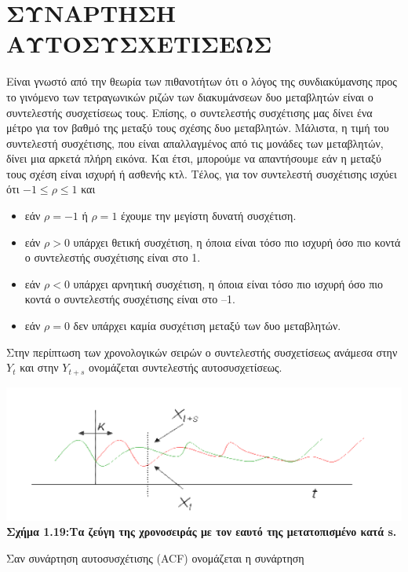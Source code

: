 \section{ΣΥΝΑΡΤΗΣΗ ΑΥΤΟΣΥΣΧΕΤΙΣΕΩΣ}

Είναι γνωστό από την θεωρία των πιθανοτήτων ότι ο λόγος της
συνδιακύμανσης προς το γινόμενο των τετραγωνικών ριζών των διακυμάνσεων δυο
μεταβλητών είναι ο συντελεστής συσχετίσεως τους. Επίσης, ο συντελεστής
συσχέτισης μας δίνει ένα μέτρο για τον βαθμό της μεταξύ τους σχέσης δυο
μεταβλητών. Μάλιστα, η τιμή του συντελεστή συσχέτισης, που είναι απαλλαγμένος
από τις μονάδες των μεταβλητών, δίνει μια αρκετά πλήρη εικόνα. Και έτσι, μπορούμε
να απαντήσουμε εάν η μεταξύ τους σχέση είναι ισχυρή ή ασθενής κτλ. Τέλος, για τον
συντελεστή συσχέτισης ισχύει ότι $-1\leq \rho\leq 1$ και\\
\begin{itemize}
\item εάν $ \rho=-1$ ή $ \rho=1$ έχουμε την μεγίστη δυνατή συσχέτιση.
\item εάν $\rho> 0$ υπάρχει θετική συσχέτιση, η όποια είναι τόσο πιο ισχυρή όσο πιο κοντά ο
συντελεστής συσχέτισης είναι στο 1.
\item εάν $\rho< 0$ υπάρχει αρνητική συσχέτιση, η όποια είναι τόσο πιο ισχυρή όσο πιο κοντά
ο συντελεστής συσχέτισης είναι στο –1.
\item εάν $\rho=0$ δεν υπάρχει καμία συσχέτιση μεταξύ των δυο μεταβλητών.\\
\end{itemize}
Στην περίπτωση των χρονολογικών σειρών ο συντελεστής συσχετίσεως
ανάμεσα στην $ Y_t$ και στην $ Y_{t+s}$
ονομάζεται συντελεστής αυτοσυσχετίσεως.\\
\begin{center}
\includegraphics[scale=0.6]{graf17.png}\\
\textbf{Σχήμα 1.19:Τα ζεύγη της χρονοσειράς με τον εαυτό της μετατοπισμένο κατά s.}
\end{center}
Σαν συνάρτηση αυτοσυσχέτισης (ACF) ονομάζεται η συνάρτηση\\
